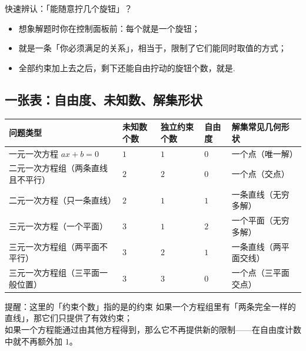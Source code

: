 \documentclass[a4paper,11pt]{ctexart}
\begin{document}
\begin{notebox}{快速辨认：「能随意拧几个旋钮」？}
  \begin{itemize}
    \item 想象解题时你在控制面板前：每个就是一个旋钮；
    \item {}就是一条「你必须满足的关系」，相当于，限制了它们能同时取值的方式；
    \item 全部约束加上去之后，剩下还能自由拧动的旋钮个数，就是.
  \end{itemize}
\end{notebox}

\subsection{一张表：自由度、未知数、解集形状}

\begin{center}

\renewcommand{\arraystretch}{1.3}
\begin{tabularx}{0.98\textwidth}{l>{\centering\arraybackslash}p{2.2cm}>{\centering\arraybackslash}p{2.4cm}>{\centering\arraybackslash}p{2.2cm}X}
  \toprule
  问题类型 & 未知数个数 & 独立约束个数 & 自由度 & 解集常见几何形状 \\
  \midrule
  一元一次方程 $ax+b=0$ & $1$ & $1$ & $0$ & 一个点（唯一解） \\
  二元一次方程组（两条直线且不平行） & $2$ & $2$ & $0$ & 一个点（交点） \\
  二元一次方程（只一条直线） & $2$ & $1$ & $1$ & 一条直线（无穷多解） \\
  三元一次方程（一个平面） & $3$ & $1$ & $2$ & 一个平面（无穷多解） \\
  三元一次方程组（两平面不平行） & $3$ & $2$ & $1$ & 一条直线（两平面交线） \\
  三元一次方程组（三平面一般位置） & $3$ & $3$ & $0$ & 一个点（三平面交点） \\
  \bottomrule
\end{tabularx}
\end{center}

\begin{notebox}{提醒：这里的「约束个数」指的是的约束}
  如果一个方程组里有「两条完全一样的直线」，那它们只提供了有效约束；\\
  如果一个方程能通过由其他方程得到，那么它不再提供新的限制——在自由度计数中就不再额外加 $1$。
\end{notebox}
\end{document}
